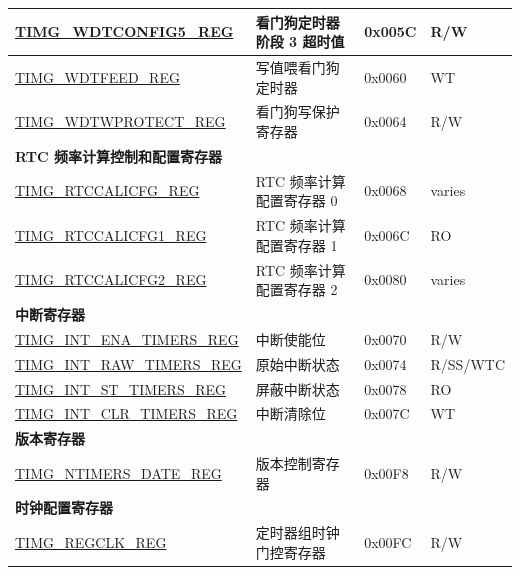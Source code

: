 \begin{longtable}{ | p{6cm} | p{7.2cm} | p{1.3cm} | p{1cm} | }
\hyperref[regdesc:TIMGWDTCONFIG5REG]{TIMG\_WDTCONFIG5\_REG} & 看门狗定时器阶段 3 超时值 & 0x005C & R/W \\ \hline
\hyperref[regdesc:TIMGWDTFEEDREG]{TIMG\_WDTFEED\_REG} & 写值喂看门狗定时器 & 0x0060 & WT \\ \hline
\hyperref[regdesc:TIMGWDTWPROTECTREG]{TIMG\_WDTWPROTECT\_REG} & 看门狗写保护寄存器 & 0x0064 & R/W \\ \hline
\multicolumn{4}{|l|}{\textbf{RTC 频率计算控制和配置寄存器}} \\ \hline
\hyperref[regdesc:TIMGRTCCALICFGREG]{TIMG\_RTCCALICFG\_REG} & RTC 频率计算配置寄存器 0 & 0x0068 & varies \\ \hline
\hyperref[regdesc:TIMGRTCCALICFG1REG]{TIMG\_RTCCALICFG1\_REG} & RTC 频率计算配置寄存器 1 & 0x006C & RO \\ \hline
\hyperref[regdesc:TIMGRTCCALICFG2REG]{TIMG\_RTCCALICFG2\_REG} & RTC 频率计算配置寄存器 2 & 0x0080 & varies \\ \hline
\multicolumn{4}{|l|}{\textbf{中断寄存器}} \\ \hline
\hyperref[regdesc:TIMGINTENATIMERSREG]{TIMG\_INT\_ENA\_TIMERS\_REG} & 中断使能位 & 0x0070 & R/W \\ \hline
\hyperref[regdesc:TIMGINTRAWTIMERSREG]{TIMG\_INT\_RAW\_TIMERS\_REG} & 原始中断状态 & 0x0074 & R/SS/WTC \\ \hline
\hyperref[regdesc:TIMGINTSTTIMERSREG]{TIMG\_INT\_ST\_TIMERS\_REG} & 屏蔽中断状态 & 0x0078 & RO \\ \hline
\hyperref[regdesc:TIMGINTCLRTIMERSREG]{TIMG\_INT\_CLR\_TIMERS\_REG} & 中断清除位 & 0x007C & WT \\ \hline
\multicolumn{4}{|l|}{\textbf{版本寄存器}} \\ \hline
\hyperref[regdesc:TIMGNTIMERSDATEREG]{TIMG\_NTIMERS\_DATE\_REG} & 版本控制寄存器 & 0x00F8 & R/W \\ \hline
\multicolumn{4}{|l|}{\textbf{时钟配置寄存器}} \\ \hline
\hyperref[regdesc:TIMGREGCLKREG]{TIMG\_REGCLK\_REG} & 定时器组时钟门控寄存器 & 0x00FC & R/W \\ \hline
\end{longtable}
